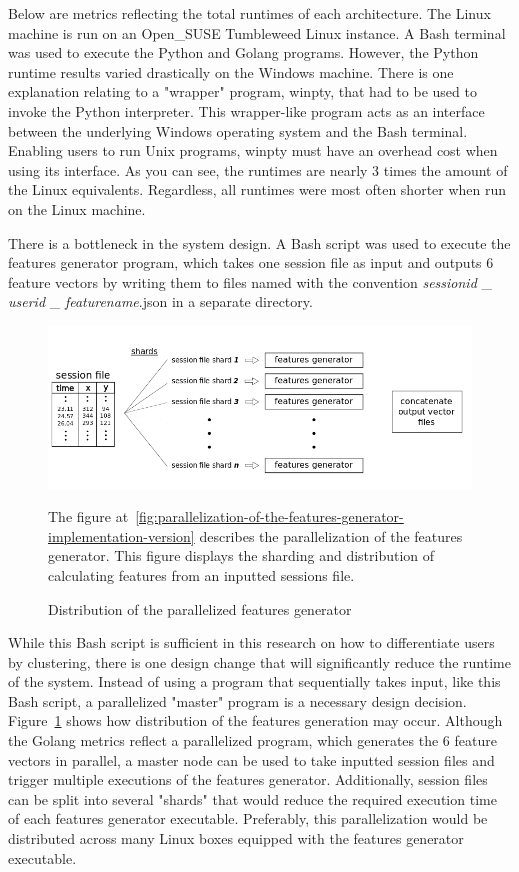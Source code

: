 Below are metrics reflecting the total runtimes of each architecture. The Linux machine is run on an Open{\_}SUSE Tumbleweed Linux instance. A Bash terminal was used to execute the Python and Golang programs. However, the Python runtime results varied drastically on the Windows machine. There is one explanation relating to a "wrapper" program, winpty, that had to be used to invoke the Python interpreter. This wrapper-like program acts as an interface between the underlying Windows operating system and the Bash terminal. Enabling users to run Unix programs, winpty must have an overhead cost when using its interface. As you can see, the runtimes are nearly 3 times the amount of the Linux equivalents. Regardless, all runtimes were most often shorter when run on the Linux machine.

There is a bottleneck in the system design. A Bash script was used to execute the features generator program, which takes one session file as input and outputs 6 feature vectors by writing them to files named with the convention \textit{sessionid} {\_} \textit{userid} {\_} \textit{featurename}.json in a separate directory.

\begin{figure}[!h]
    \centering
    \includegraphics[width=1\columnwidth]{figures/parallelized_features_generator_distributed}
    \caption{Distribution of the parallelized features generator}
    \label{fig:distribution-of-the-parallelize-features-generator}
    {\small The figure at~\ref{fig:parallelization-of-the-features-generator-implementation-version} describes the parallelization of the features generator. This figure displays the sharding and distribution of calculating features from an inputted sessions file.}
\end{figure}

While this Bash script is sufficient in this research on how to differentiate users by clustering, there is one design change that will significantly reduce the runtime of the system. Instead of using a program that sequentially takes input, like this Bash script, a parallelized "master" program is a necessary design decision. Figure~\ref{fig:distribution-of-the-parallelize-features-generator} shows how distribution of the features generation may occur. Although the Golang metrics reflect a parallelized program, which generates the 6 feature vectors in parallel, a master node can be used to take inputted session files and trigger multiple executions of the features generator. Additionally, session files can be split into several "shards" that would reduce the required execution time of each features generator executable. Preferably, this parallelization would be distributed across many Linux boxes equipped with the features generator executable.

